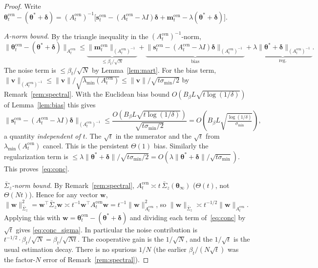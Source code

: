 \documentclass[11pt]{article}
\begin{document}
\begin{proof}
Write
$\bm{\theta}_t^{\mathrm{cen}}-(\bm{\theta}^{\!*}+\bm{\delta})
=(A_t^{\mathrm{cen}})^{-1}\bigl[\bm{s}_t^{\mathrm{cen}}
-(A_t^{\mathrm{cen}}-\lambda I)\bm{\delta}
+\bm{m}_t^{\mathrm{cen}}-\lambda(\bm{\theta}^{\!*}+\bm{\delta})\bigr]$.

\emph{$A$-norm bound.}  By the triangle inequality in the
$(A_t^{\mathrm{cen}})^{-1}$-norm,
\[
\|\bm{\theta}_t^{\mathrm{cen}}-(\bm{\theta}^{\!*}+\bm{\delta})\|_{A_t^{\mathrm{cen}}}
\leq\underbrace{\|\bm{m}_t^{\mathrm{cen}}\|_{(A_t^{\mathrm{cen}})^{-1}}}_{\leq\beta_t/\sqrt N}
+\underbrace{\|\bm{s}_t^{\mathrm{cen}}-(A_t^{\mathrm{cen}}-\lambda I)\bm{\delta}\|_{(A_t^{\mathrm{cen}})^{-1}}}_{\text{bias}}
+\underbrace{\lambda\|\bm{\theta}^{\!*}+\bm{\delta}\|_{(A_t^{\mathrm{cen}})^{-1}}}_{\text{reg.}}.
\]
The noise term is $\leq\beta_t/\sqrt N$ by Lemma~\ref{lem:mart}.
For the bias term, $\|\bm{v}\|_{(A_t^{\mathrm{cen}})^{-1}}\leq
\|\bm{v}\|/\sqrt{\lambda_{\min}(A_t^{\mathrm{cen}})}\leq\|\bm{v}\|/\sqrt{t\sigma_{\min}/2}$
by Remark~\ref{rem:spectral}. With the Euclidean bias bound
$O(B_\beta L\sqrt{t\log(1/\delta)})$ of Lemma~\ref{lem:bias} this gives
\[
\|\bm{s}_t^{\mathrm{cen}}-(A_t^{\mathrm{cen}}-\lambda I)\bm{\delta}\|_{(A_t^{\mathrm{cen}})^{-1}}
\leq\frac{O(B_\beta L\sqrt{t\log(1/\delta)})}{\sqrt{t\sigma_{\min}/2}}
=O\!\left(B_\beta L\sqrt{\tfrac{\log(1/\delta)}{\sigma_{\min}}}\right),
\]
a quantity \emph{independent of $t$}. The $\sqrt t$ in the
numerator and the $\sqrt t$ from $\lambda_{\min}(A_t^{\mathrm{cen}})$
cancel.  This is the persistent $\Theta(1)$ bias.
Similarly the regularization term is
$\leq\lambda\|\bm{\theta}^{\!*}+\bm{\delta}\|/\sqrt{t\sigma_{\min}/2}
=O(\lambda\|\bm{\theta}^{\!*}+\bm{\delta}\|/\sqrt{t\sigma_{\min}})$.
This proves~\eqref{eq:conc}.

\emph{$\bar{\Sigma}_z$-norm bound.}  By Remark~\ref{rem:spectral},
$A_t^{\mathrm{cen}}\asymp t\,\bar{\Sigma}_z(\bm{\theta}_\infty)$
($\Theta(t)$, not $\Theta(Nt)$).  Hence for any vector $\bm{w}$,
$\|\bm{w}\|_{\bar{\Sigma}_z}^2=\bm{w}^\top\bar{\Sigma}_z\bm{w}
\asymp t^{-1}\bm{w}^\top A_t^{\mathrm{cen}}\bm{w}
=t^{-1}\|\bm{w}\|_{A_t^{\mathrm{cen}}}^2$,
so $\|\bm{w}\|_{\bar{\Sigma}_z}\asymp t^{-1/2}\|\bm{w}\|_{A_t^{\mathrm{cen}}}$.
Applying this with
$\bm{w}=\bm{\theta}_t^{\mathrm{cen}}-(\bm{\theta}^{\!*}+\bm{\delta})$
and dividing each term of~\eqref{eq:conc} by $\sqrt t$ gives
\eqref{eq:conc_sigma}.  In particular the noise contribution is
$t^{-1/2}\cdot\beta_t/\sqrt N=\beta_t/\sqrt{Nt}$. The cooperative
gain is the $1/\sqrt N$, and the $1/\sqrt t$ is the usual estimation
decay. There is no spurious $1/N$ (the earlier
$\beta_t/(N\sqrt t)$ was the factor-$N$ error of
Remark~\ref{rem:spectral}).
\end{proof}
\end{document}
